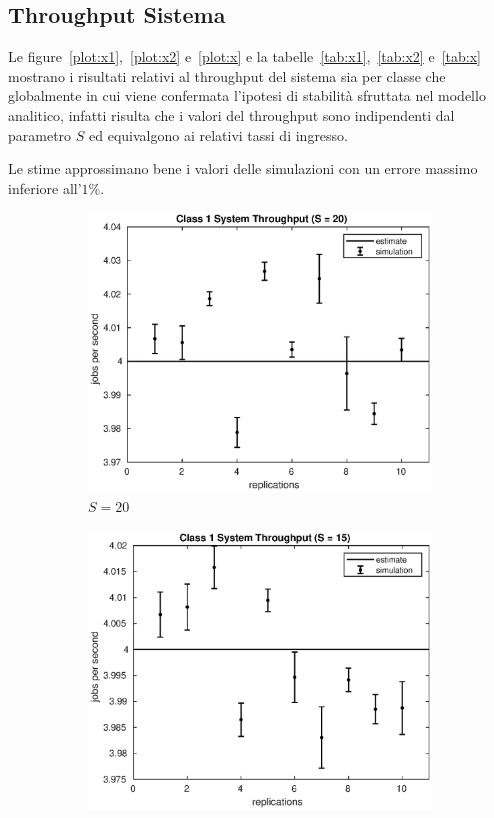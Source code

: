 \subsection{Throughput Sistema}
Le figure~\ref{plot:x1},~\ref{plot:x2} e~\ref{plot:x} e la
tabelle~\ref{tab:x1},~\ref{tab:x2} e~\ref{tab:x} mostrano i risultati relativi
al throughput del sistema sia per classe che globalmente in cui viene confermata
l'ipotesi di stabilità sfruttata nel modello analitico, infatti risulta che i
valori del throughput sono indipendenti dal parametro $S$ ed equivalgono ai
relativi tassi di ingresso. 

Le stime approssimano bene i valori delle simulazioni con un errore massimo
inferiore all'$1\%$.
\begin{figure}[!h]
\centering
%
\begin{subfigure}[t]{0.49\textwidth}
\includegraphics[width=\textwidth]{figures/simul/20_500K_x1}
\caption{$S = 20$}
\label{20_x1}
\end{subfigure}
%
\begin{subfigure}[t]{0.49\textwidth}
\includegraphics[width=\textwidth]{figures/simul/15_500K_x1}

\end{subfigure}
\end{figure}
